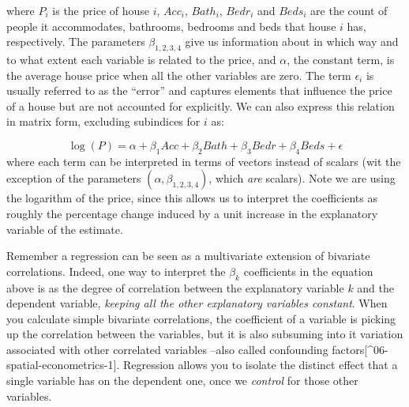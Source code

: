 \documentclass[
  letterpaper,
  DIV=11,
  numbers=noendperiod,
  oneside]{scrreprt}
\begin{document}
where \(P_i\) is the price of house \(i\), \(Acc_i\), \(Bath_i\),
\(Bedr_i\) and \(Beds_i\) are the count of people it accommodates,
bathrooms, bedrooms and beds that house \(i\) has, respectively. The
parameters \(\beta_{1,2, 3, 4}\) give us information about in which way
and to what extent each variable is related to the price, and
\(\alpha\), the constant term, is the average house price when all the
other variables are zero. The term \(\epsilon_i\) is usually referred to
as the ``error'' and captures elements that influence the price of a
house but are not accounted for explicitly. We can also express this
relation in matrix form, excluding subindices for \(i\) as:

\[
\log(P) = \alpha + \beta_1 Acc + \beta_2 Bath + \beta_3 Bedr + \beta_4 Beds + \epsilon
\] where each term can be interpreted in terms of vectors instead of
scalars (wit the exception of the parameters
\((\alpha, \beta_{1, 2, 3, 4})\), which \emph{are} scalars). Note we are
using the logarithm of the price, since this allows us to interpret the
coefficients as roughly the percentage change induced by a unit increase
in the explanatory variable of the estimate.

Remember a regression can be seen as a multivariate extension of
bivariate correlations. Indeed, one way to interpret the \(\beta_k\)
coefficients in the equation above is as the degree of correlation
between the explanatory variable \(k\) and the dependent variable,
\emph{keeping all the other explanatory variables constant}. When you
calculate simple bivariate correlations, the coefficient of a variable
is picking up the correlation between the variables, but it is also
subsuming into it variation associated with other correlated variables
--also called confounding factors{[}\^{}06-spatial-econometrics-1{]}.
Regression allows you to isolate the distinct effect that a single
variable has on the dependent one, once we \emph{control} for those
other variables.
\end{document}
